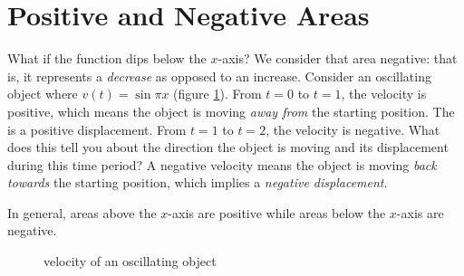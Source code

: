 \section{Positive and Negative Areas}
What if the function dips below the $x$-axis? We consider that area 
negative: that is, it represents a \textit{decrease} as opposed to 
an increase. Consider an oscillating object where $v(t) = 
\sin{\pi x}$ (figure \ref{fig:oscillate}). From $t = 0$ to $t = 1$, 
the velocity is positive, which means the object is moving 
\textit{away from} the starting position. The is a positive 
displacement. From $t = 1$ to $t = 2$, the velocity is negative. What 
does this tell you about the direction the object is moving and its 
displacement during this time period? A negative velocity means the 
object is moving \textit{back towards} the starting position, which 
implies a \textit{negative displacement}.

In general, areas above the $x$-axis are positive while areas below 
the $x$-axis are negative.

\begin{figure}
	\caption{velocity of an oscillating object}
	\label{fig:oscillate}
\end{figure}

